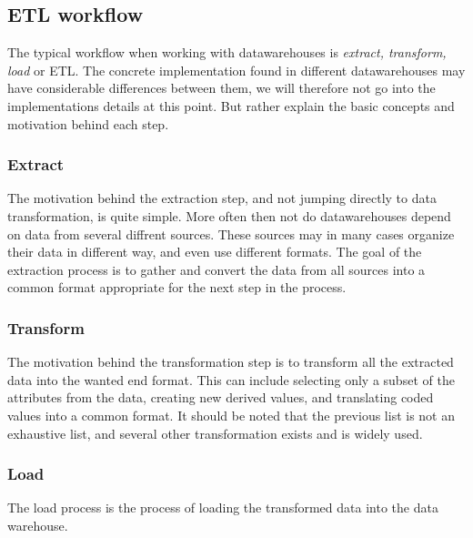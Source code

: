 	\subsection{ETL workflow}
		The typical workflow when working with datawarehouses is \textit{extract, transform, load} or ETL. 
		The concrete implementation found in different datawarehouses may have considerable differences between them, 
		we will therefore not go into the implementations details at this point. But rather explain the basic concepts
		and motivation behind each step.
		
		\subsubsection{Extract}
			The motivation behind the extraction step, and not jumping directly to data transformation, is quite simple. More often then not do datawarehouses depend on data from several diffrent sources. These sources may in many cases organize their data in different way, and even use different formats. 
			The goal of the extraction process is to gather and convert the data from all sources into a common format appropriate for the next step in the process.
			
		\subsubsection{Transform}
			The motivation behind the transformation step is to transform all the extracted data into the wanted end format. This can include selecting only a subset of the attributes from the data, creating new derived values, and translating coded values into a common format. It should be noted that the previous list is not an exhaustive list, and several other transformation exists and is widely used.
			
		\subsubsection{Load}
			The load process is the process of loading the transformed data into the data warehouse. 